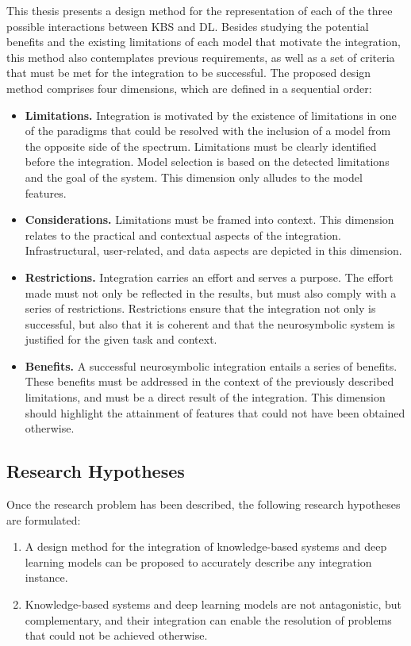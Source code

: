 This thesis presents a design method for the representation of each of the three possible interactions between KBS and DL. Besides studying the potential benefits and the existing limitations of each model that motivate the integration, this method also contemplates previous requirements, as well as a set of criteria that must be met for the integration to be successful. The proposed design method comprises four dimensions, which are defined in a sequential order:
\begin{itemize}
    \item \textbf{Limitations.} Integration is motivated by the existence of limitations in one of the paradigms that could be resolved with the inclusion of a model from the opposite side of the spectrum. Limitations must be clearly identified before the integration. Model selection is based on the detected limitations and the goal of the system. This dimension only alludes to the model features.
    
    \item \textbf{Considerations.} Limitations must be framed into context. This dimension relates to the practical and contextual aspects of the integration. Infrastructural, user-related, and data aspects are depicted in this dimension.
    
    \item \textbf{Restrictions.} Integration carries an effort and serves a purpose. The effort made must not only be reflected in the results, but must also comply with a series of restrictions. Restrictions ensure that the integration not only is successful, but also that it is coherent and that the neurosymbolic system is justified for the given task and context.
    
    \item \textbf{Benefits.} A successful neurosymbolic integration entails a series of benefits. These benefits must be addressed in the context of the previously described limitations, and must be a direct result of the integration. This dimension should highlight the attainment of features that could not have been obtained otherwise.
\end{itemize}

\subsection{Research Hypotheses}
Once the research problem has been described, the following research hypotheses are formulated:
\begin{enumerate} [start=1,label={\bfseries H\arabic*:}]
    \item A design method for the integration of knowledge-based systems and deep learning models can be proposed to accurately describe any integration instance. 
    \item Knowledge-based systems and deep learning models are not antagonistic, but complementary, and their integration can enable the resolution of problems that could not be achieved otherwise.
\end{enumerate}

